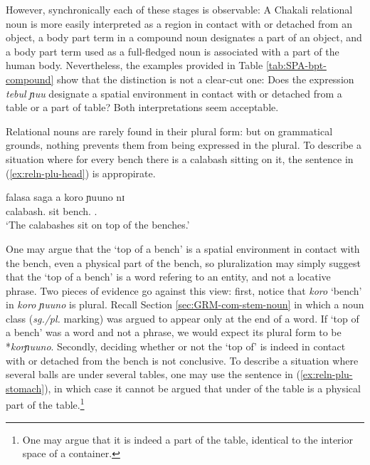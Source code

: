 \begin{exe}
\begin{exe}
\begin{exe}
{\begin{exe}
\begin{exe}
\begin{exe}
\begin{exe}
\begin{exe}
\begin{exe}
\begin{exe}
However, synchronically each of these stages is observable: A  Chakali 
relational noun is more easily interpreted as  a region in contact with or
detached from an object, a body part term in a compound
noun designates
a part of an object, and a body part term used as
a full-fledged noun is associated with a part of the human body. 
Nevertheless, the examples provided in Table \ref{tab:SPA-bpt-compound} show
that the distinction is not a clear-cut one: Does the expression {\it tebul ɲuu}
designate a spatial environment  in contact with or detached from a table or  a
part of table? Both interpretations seem acceptable.

Relational nouns
are rarely found in their plural form: but on grammatical grounds, nothing
prevents them from being expressed in the plural. 
To describe a situation where  for every bench there is a calabash sitting on
it, 
the sentence in (\ref{ex:reln-plu-head}) is appropirate.


\ea\label{ex:reln-plu-head}
\gll falasa saga a koro ɲuuno nɪ \\
calabash.{\pl}  sit {\art} bench.{\pl}  {\reln .\pl} {\postp}\\
\glt `The calabashes sit on top of the benches.' 
\z

One may argue that the `top of a bench' is a spatial environment  in contact
with the bench, even a physical part of the bench, so pluralization may simply
suggest that the   `top of a bench' is a word refering to an entity,  and not a
locative phrase. Two pieces of evidence go against this view: first,  notice
that {\it koro} `bench'  in {\it koro ɲuuno} is plural.  Recall Section
\ref{sec:GRM-com-stem-noun} in which a noun class ({\it sg./pl.} marking) was
argued to  appear only at the end of a word. If  `top of a bench' was a word and
not a phrase, we would expect its plural form to be  *{\it korɲuuno}. Secondly, 
deciding whether or not the `top of' is indeed in contact with or detached from
the bench is not conclusive. To describe a situation where several balls are
under several tables, one may use the sentence in (\ref{ex:reln-plu-stomach}), 
in which case it cannot be argued that  under of the table is a physical part of
the table.\footnote{One may argue that it is indeed a part of the table,
identical to the interior space of a container.}


\end{exe}
\end{exe}
\end{exe}
\end{exe}
\end{exe}
\end{exe}
\end{exe}}
\end{exe}
\end{exe}
\end{exe}
